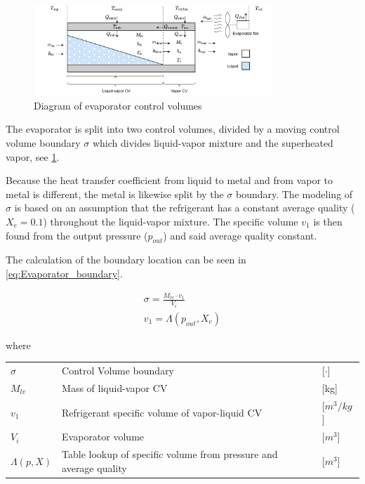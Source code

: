 \begin{figure}[h!]
	\centering
	\includegraphics[width=0.8\textwidth]{Graphics/Evaporator_CV_diagram.pdf}
	\caption{Diagram of evaporator control volumes}
	\label{fig:evap_CV}
\end{figure}

The evaporator is split into two control volumes, divided by a moving control volume boundary $\sigma$ which divides liquid-vapor mixture and the superheated vapor, see \cref{fig:evap_CV}.

Because the heat transfer coefficient from liquid to metal and from vapor to metal is different, the metal is likewise split by the $\sigma$ boundary. The modeling of $\sigma$ is based on an assumption that the refrigerant has a constant average quality ($X_e = 0.1$) throughout the liquid-vapor mixture. The specific volume $v_1$ is then found from the output pressure ($p_{out}$) and said average quality constant.

The calculation of the boundary location can be seen in \cref{eq:Evaporator_boundary}.

\begin{align} \label{eq:Evaporator_boundary}
	\sigma = \frac{M_{lv} \cdot v_1}{V_i} \\
	v_1 = \Lambda(p_{out},X_e)
\end{align}

where

\begin{center}
	\begin{tabular}{l p{10cm} l}
		$\sigma$   & Control Volume boundary                                           & [$\cdot$]            \\
		$M_{lv}$   & Mass of liquid-vapor CV                                           & [\si{kg}]            \\
		$v_1$      & Refrigerant specific volume of vapor-liquid CV                    & [$\si{m}^3/\si{kg}$] \\
		$V_i$      & Evaporator volume                                                 & [$\si{m}^3$]         \\
		$\Lambda(p,X)$ & Table lookup of specific volume from pressure and average quality & [$\si{m}^3$]
	\end{tabular}
\end{center}

